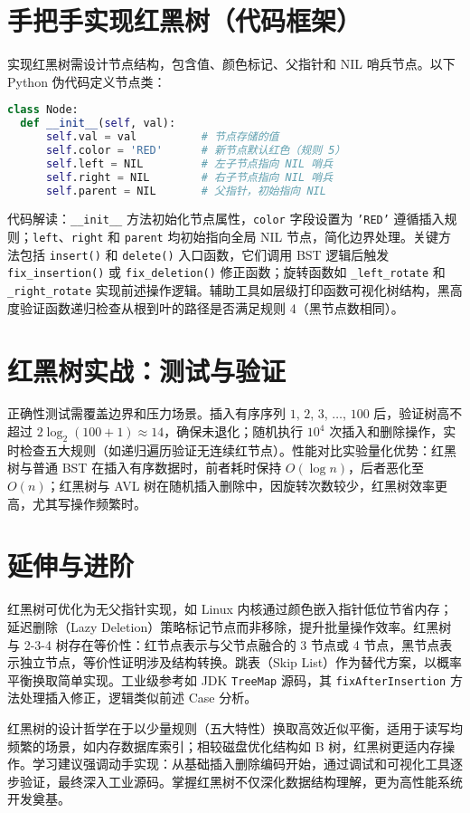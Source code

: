 \chapter{手把手实现红黑树（代码框架）}
实现红黑树需设计节点结构，包含值、颜色标记、父指针和 NIL 哨兵节点。以下 Python 伪代码定义节点类：\par
\begin{lstlisting}[language=python]
class Node:
  def __init__(self, val):
      self.val = val          # 节点存储的值
      self.color = 'RED'      # 新节点默认红色（规则 5）
      self.left = NIL         # 左子节点指向 NIL 哨兵
      self.right = NIL        # 右子节点指向 NIL 哨兵
      self.parent = NIL       # 父指针，初始指向 NIL
\end{lstlisting}
代码解读：\texttt{\_{}\_{}init\_{}\_{}} 方法初始化节点属性，\texttt{color} 字段设置为 \texttt{'RED'} 遵循插入规则；\texttt{left}、\texttt{right} 和 \texttt{parent} 均初始指向全局 NIL 节点，简化边界处理。关键方法包括 \texttt{insert()} 和 \texttt{delete()} 入口函数，它们调用 BST 逻辑后触发 \texttt{fix\_{}insertion()} 或 \texttt{fix\_{}deletion()} 修正函数；旋转函数如 \texttt{\_{}left\_{}rotate} 和 \texttt{\_{}right\_{}rotate} 实现前述操作逻辑。辅助工具如层级打印函数可视化树结构，黑高度验证函数递归检查从根到叶的路径是否满足规则 4（黑节点数相同）。\par
\chapter{红黑树实战：测试与验证}
正确性测试需覆盖边界和压力场景。插入有序序列 $1$, $2$, $3$, $\ldots$, $100$ 后，验证树高不超过 $2 \log_2(100 + 1) \approx14$，确保未退化；随机执行 $10^4$ 次插入和删除操作，实时检查五大规则（如递归遍历验证无连续红节点）。性能对比实验量化优势：红黑树与普通 BST 在插入有序数据时，前者耗时保持 $O(\log{n})$，后者恶化至 $O(n)$；红黑树与 AVL 树在随机插入删除中，因旋转次数较少，红黑树效率更高，尤其写操作频繁时。\par
\chapter{延伸与进阶}
红黑树可优化为无父指针实现，如 Linux 内核通过颜色嵌入指针低位节省内存；延迟删除（Lazy Deletion）策略标记节点而非移除，提升批量操作效率。红黑树与 2-3-4 树存在等价性：红节点表示与父节点融合的 3 节点或 4 节点，黑节点表示独立节点，等价性证明涉及结构转换。跳表（Skip List）作为替代方案，以概率平衡换取简单实现。工业级参考如 JDK \texttt{TreeMap} 源码，其 \texttt{fixAfterInsertion} 方法处理插入修正，逻辑类似前述 Case 分析。\par
红黑树的设计哲学在于以少量规则（五大特性）换取高效近似平衡，适用于读写均频繁的场景，如内存数据库索引；相较磁盘优化结构如 B 树，红黑树更适内存操作。学习建议强调动手实现：从基础插入删除编码开始，通过调试和可视化工具逐步验证，最终深入工业源码。掌握红黑树不仅深化数据结构理解，更为高性能系统开发奠基。\par
